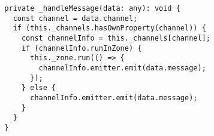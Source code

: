 \begin{verbatim}
  private _handleMessage(data: any): void {
    const channel = data.channel;
    if (this._channels.hasOwnProperty(channel)) {
      const channelInfo = this._channels[channel];
      if (channelInfo.runInZone) {
        this._zone.run(() => {
          channelInfo.emitter.emit(data.message);
        });
      } else {
        channelInfo.emitter.emit(data.message);
      }
    }
  }
\end{verbatim}
